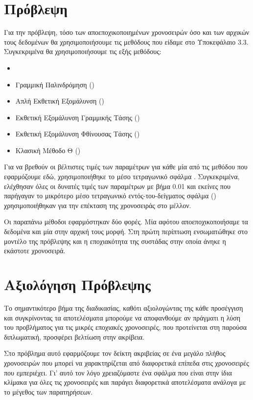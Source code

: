 \section{Πρόβλεψη}

Για την πρόβλεψη, τόσο των αποεποχικοποιημένων χρονοσειρών όσο και των αρχικών τους δεδομένων θα χρησιμοποιήσουμε τις μεθόδους που είδαμε στο Υποκεφάλαιο 3.3. Συγκεκριμένα θα χρησιμοποιήσουμε τις εξής μεθόδους:

\begin{itemize}
  \item {}
  \item Γραμμική Παλινδρόμηση ()
  \item Απλή Εκθετική Εξομάλυνση ()
  \item Εκθετική Εξομάλυνση Γραμμικής Τάσης ()
  \item Εκθετική Εξομάλυνση Φθίνουσας Τάσης ()
  \item Κλασική Μέθοδο Θ ()
\end{itemize}

Για να βρεθούν οι βέλτιστες τιμές των παραμέτρων για κάθε μία από τις μεθόδου που εφαρμόζουμε εδώ, χρησιμοποιήθηκε το μέσο τετραγωνικό σφάλμα . Συγκεκριμένα, ελέχθησαν όλες οι δυνατές τιμές των παραμέτρων με βήμα 0.01 και εκείνες που παρήγαγαν το μικρότερο μέσο τετραγωνικό εντός-του-δείγματος σφάλμα () χρησιμοποιήθηκαν για την επέκταση της χρονοσειράς στο μέλλον. 

Οι παραπάνω μέθοδοι εφαρμόστηκαν δύο φορές. Μία αφότου αποεποχικοποιήσαμε τα δεδομένα και μία στην αρχική τους μορφή. Στη πρώτη περίπτωση ενσωματώθηκε στο μοντέλο της πρόβλεψης και η εποχιακότητα της συστάδας στην οποία άνηκε η εκάστοτε χρονοσειρά.

\section{Αξιολόγηση Πρόβλεψης}

Το σημαντικότερο βήμα της διαδικασίας, καθότι αξιολογώντας της κάθε προσέγγιση και συγκρίνοντας τα αποτελέσματα μπορούμε να αποφανθούμε αν πράγματι η λύση του προβλήματος για τις μικρές εποχιακές χρονοσειρές, που προτείνεται στη παρούσα διπλωματική, προσφέρει βελτίωση στην ακρίβεια.

Στο πρόβλημα αυτό εφαρμόζουμε τον δείκτη ακριβείας σε ένα μεγάλο πλήθος χρονοσειρών που μπορεί να χαρακτηρίζεται από διαφορετικά επίπεδα στις χρονοσειρές που εμπεριέχει. Γι' αυτό τον λόγο χρειαζόμαστε ένα σφάλμα που είναι στην ίδια κλίμακα για όλες τις χρονοσειρές και παράγει διαφορετικά αποτελέσματα ανάλογα με το μέγεθος των παρατηρήσεων.

